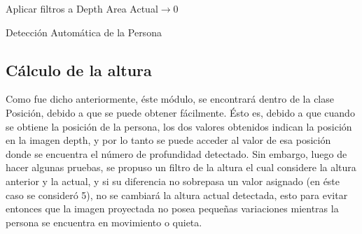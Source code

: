 \documentclass[a4paper,openright,12pt]{report}
\begin{document}
\begin{algorithm}[tbh]
	\SetAlgoLined
	Aplicar filtros a Depth\;
	Area Actual$\rightarrow$0\;
	\caption{Detección Automática de la Persona}
	\label{alg:deteccAutomatica}
\end{algorithm}
\subsection{Cálculo de la altura}
Como fue dicho anteriormente, éste módulo, se encontrará dentro de la clase Posición, debido a que se puede obtener fácilmente. Ésto es, debido a que cuando se obtiene la posición de la persona, los dos valores obtenidos indican la posición en la imagen depth, y por lo tanto se puede acceder al valor de esa posición donde se encuentra el número de profundidad detectado. Sin embargo, luego de hacer algunas pruebas, se propuso un filtro de la altura el cual considere la altura anterior y la actual, y si su diferencia no sobrepasa un valor asignado (en éste caso se consideró 5), no se cambiará la altura actual detectada, esto para evitar entonces que la imagen proyectada no posea pequeñas variaciones mientras la persona se encuentra en movimiento o quieta.
\end{document}
